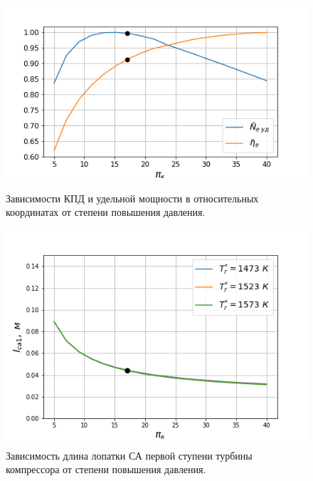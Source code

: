 \documentclass[a4paper,12pt]{article}
\begin{document}
    \begin{figure}[h!]
        \centering
        \includegraphics[scale=0.8]{../plots/cycle_N_e_sp_rel_eta_e_rel.png}
        \caption{Зависимости КПД и удельной мощности в относительных координатах от степени повышения давления.}
        \label{cycle_N_e_sp_rel_eta_e_rel}

        \includegraphics[scale=0.8]{../plots/cycle_l_sa1.png}
        \caption{Зависимость длина лопатки СА первой ступени турбины компрессора от степени повышения давления.}
        \label{cycle_l_sa1}
    \end{figure}
\end{document}
